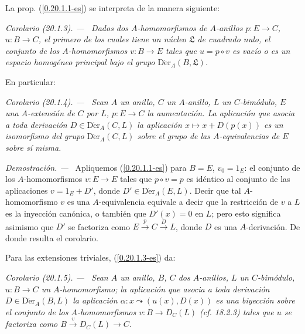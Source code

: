 \documentclass[10pt,oneside]{book}
\makeatletter
\newcommand{\sref}[1]{\textup{(\ref{#1})}}
\newcommand{\setmanualcurrentlabel}[1]{\def\@currentlabel{#1}}
\newcommand{\oldpage}[2][]{%
  \setcounter{footnote}{0}%
  \marginpar{\scriptsize\textbf{#1}~|~#2}\ignorespaces}
\newenvironment{corollary}[1][]{%
  \setmanualcurrentlabel{#1}\par\medskip\noindent\itshape Corolario (#1). ---\ }{\par}
\newenvironment{proof}{%
  \par\medskip\noindent\textit{Demostración. ---\ }}{\par}
\makeatother
\begin{document}
\oldpage[0\textsubscript{IV-1}]{118}
La prop. \sref{0.20.1.1-es} se interpreta de la manera siguiente:

\begin{corollary}[20.1.3]
\label{0.20.1.3-es}
Dados dos $A$-homomorfismos de $A$-anillos $p:E\to C$,
$u:B\to C$, el primero de los cuales tiene un núcleo $\mathfrak L$ de cuadrado
nulo, el conjunto de los $A$-homomorfismos $v:B\to E$ tales que $u=p\circ v$
es vacío o es un espacio homogéneo principal bajo el grupo
$\operatorname{D\acute{e}r}_A(B,\mathfrak L)$.
\end{corollary}

En particular:

\begin{corollary}[20.1.4]
\label{0.20.1.4-es}
Sean $A$ un anillo, $C$ un $A$-anillo, $L$ un $C$-bimódulo, $E$ una
$A$-extensión de $C$ por $L$, $p:E\to C$ la aumentación. La aplicación que
asocia a toda derivación $D\in\operatorname{D\acute{e}r}_A(C,L)$ la aplicación
$x\mapsto x+D(p(x))$ es un isomorfismo del grupo
$\operatorname{D\acute{e}r}_A(C,L)$ sobre el grupo de las $A$-equivalencias de $E$
sobre sí misma.
\end{corollary}

\begin{proof}
Apliquemos \sref{0.20.1.1-es} para $B=E$, $v_0=1_E$: el conjunto
de los $A$-homomorfismos $v:E\to E$ tales que $p\circ v=p$ es idéntico al
conjunto de las aplicaciones $v=1_E+D'$, donde
$D'\in\operatorname{D\acute{e}r}_A(E,L)$. Decir que tal $A$-homomorfismo $v$ es
una $A$-equivalencia equivale a decir que la restricción de $v$ a $L$ es la
inyección canónica, o también que $D'(x)=0$ en $L$; pero esto significa asimismo
que $D'$ se factoriza como $E\xrightarrow{p}C\xrightarrow{D}L$, donde $D$ es una
$A$-derivación. De donde resulta el corolario.
\end{proof}

Para las extensiones triviales, \sref{0.20.1.3-es} da:

\begin{corollary}[20.1.5]
\label{0.20.1.5-es}
Sean $A$ un anillo, $B$, $C$ dos $A$-anillos, $L$ un $C$-bimódulo,
$u:B\to C$ un $A$-homomorfismo; la aplicación que asocia a toda derivación
$D\in\operatorname{D\acute{e}r}_A(B,L)$ la aplicación
$\alpha:x\leadsto(u(x),D(x))$ es una biyección sobre el conjunto de los
$A$-homomorfismos $v:B\to D_C(L)$ \textup{(cf. 18.2.3)} tales que $u$ se factoriza como
$B\xrightarrow{v}D_C(L)\to C$.
\end{corollary}
\end{document}
